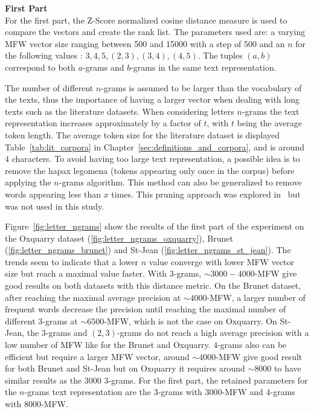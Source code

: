 \textbf{First Part}\\
For the first part, the Z-Score normalized cosine distance measure is used to compare the vectors and create the rank list.
The parameters used are: a varying MFW vector size ranging between 500 and 15000 with a step of 500 and an $n$ for the following values : $3, 4, 5, (2, 3), (3, 4), (4, 5)$.
The tuples $(a, b)$ correspond to both $a$-grams and $b$-grams in the same text representation.

The number of different $n$-grams is assumed to be larger than the vocabulary of the texts, thus the importance of having a larger vector when dealing with long texts such as the literature datasets.
When considering letters $n$-grams the text representation increases approximately by a factor of $t$, with $t$ being the average token length.
The average token size for the literature dataset is displayed Table~\ref{tab:lit_corpora} in Chapter~\ref{sec:definitions_and_corpora}, and is around $4$ characters.
To avoid having too large text representation, a possible idea is to remove the hapax legomena (tokens appearing only once in the corpus) before applying the $n$-grams algorithm.
This method can also be generalized to remove words appearing less than $x$ times.
This pruning approach was explored in~\cite{kocher_linking} but was not used in this study.

Figure~\ref{fig:letter_ngrams} show the results of the first part of the experiment on the Oxquarry dataset (\ref{fig:letter_ngrams_oxquarry}), Brunet (\ref{fig:letter_ngrams_brunet}) and St-Jean (\ref{fig:letter_ngrams_st_jean}).
The trends seem to indicate that a lower $n$ value converge with lower MFW vector size but reach a maximal value faster.
With $3$-grams, $\sim 3000-4000$-MFW give good results on both datasets with this distance metric.
On the Brunet dataset, after reaching the maximal average precision at $\sim 4000$-MFW, a larger number of frequent words decrease the precision until reaching the maximal number of different $3$-grams at $\sim 6500$-MFW, which is not the case on Oxquarry.
On St-Jean, the $3$-grams and $(2,3)$-grams do not reach a high average precision with a low number of MFW like for the Brunet and Oxquarry.
$4$-grams also can be efficient but require a larger MFW vector, around $\sim 4000$-MFW give good result for both Brunet and St-Jean but on Oxquarry it requires around $\sim 8000$ to have similar results as the $3000$ $3$-grams.
For the first part, the retained parameters for the $n$-grams text representation are the $3$-grams with $3000$-MFW and $4$-grams with $8000$-MFW.

